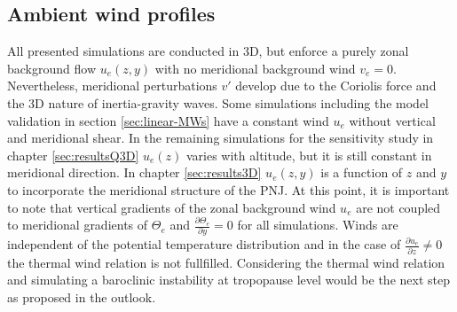 \subsection*{Ambient wind profiles}
All presented simulations are conducted in 3D, but enforce a purely zonal background flow $u_e(z,y)$ with no meridional background wind $v_e=0$. Nevertheless, meridional perturbations $v'$ develop due to the Coriolis force and the 3D nature of inertia-gravity waves. Some simulations including the model validation in section \ref{sec:linear-MWs} have a constant wind $u_e$ without vertical and meridional shear. In the remaining simulations for the sensitivity study in chapter \ref{sec:resultsQ3D} $u_e(z)$ varies with altitude, but it is still constant in meridional direction. In chapter \ref{sec:results3D} $u_e(z,y)$ is a function of $z$ and $y$ to incorporate the meridional structure of the PNJ. At this point, it is important to note that vertical gradients of the zonal background wind $u_e$ are not coupled to meridional gradients of $\Theta_e$ and $\frac{\partial \Theta_e}{\partial y}=0$ for all simulations. Winds are independent of the potential temperature distribution and in the case of $\frac{\partial u_e}{\partial z} \neq 0$ the thermal wind relation is not fullfilled. Considering the thermal wind relation and simulating a baroclinic instability at tropopause level would be the next step as proposed in the outlook.

